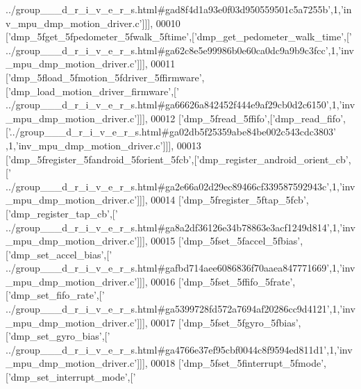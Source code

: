 \begin{DoxyCode}
{      ../group\_\_\_d\_r\_i\_v\_e\_r\_s.html#gad8f4d1a93e0f03d950559501c5a7255b'},1,\textcolor{stringliteral}{'inv\_mpu\_dmp\_motion\_driver.c'}]]],
00010   [\textcolor{stringliteral}{'dmp\_5fget\_5fpedometer\_5fwalk\_5ftime'},[\textcolor{stringliteral}{'dmp\_get\_pedometer\_walk\_time'},[\textcolor{stringliteral}{'
      ../group\_\_\_d\_r\_i\_v\_e\_r\_s.html#ga62c8e5e99986b0e60ca0dc9a9b9c3fcc'},1,\textcolor{stringliteral}{'inv\_mpu\_dmp\_motion\_driver.c'}]]],
00011   [\textcolor{stringliteral}{'dmp\_5fload\_5fmotion\_5fdriver\_5ffirmware'},[\textcolor{stringliteral}{'dmp\_load\_motion\_driver\_firmware'},[\textcolor{stringliteral}{'
      ../group\_\_\_d\_r\_i\_v\_e\_r\_s.html#ga66626a842452f444e9af29cb0d2c6150'},1,\textcolor{stringliteral}{'inv\_mpu\_dmp\_motion\_driver.c'}]]],
00012   [\textcolor{stringliteral}{'dmp\_5fread\_5ffifo'},[\textcolor{stringliteral}{'dmp\_read\_fifo'},[\textcolor{stringliteral}{'../group\_\_\_d\_r\_i\_v\_e\_r\_s.html#ga02db5f25359abe84be002c543cdc3803'}
      ,1,\textcolor{stringliteral}{'inv\_mpu\_dmp\_motion\_driver.c'}]]],
00013   [\textcolor{stringliteral}{'dmp\_5fregister\_5fandroid\_5forient\_5fcb'},[\textcolor{stringliteral}{'dmp\_register\_android\_orient\_cb'},[\textcolor{stringliteral}{'
      ../group\_\_\_d\_r\_i\_v\_e\_r\_s.html#ga2e66a02d29ec89466cf339587592943c'},1,\textcolor{stringliteral}{'inv\_mpu\_dmp\_motion\_driver.c'}]]],
00014   [\textcolor{stringliteral}{'dmp\_5fregister\_5ftap\_5fcb'},[\textcolor{stringliteral}{'dmp\_register\_tap\_cb'},[\textcolor{stringliteral}{'
      ../group\_\_\_d\_r\_i\_v\_e\_r\_s.html#ga8a2df36126e34b78863e3acf1249d814'},1,\textcolor{stringliteral}{'inv\_mpu\_dmp\_motion\_driver.c'}]]],
00015   [\textcolor{stringliteral}{'dmp\_5fset\_5faccel\_5fbias'},[\textcolor{stringliteral}{'dmp\_set\_accel\_bias'},[\textcolor{stringliteral}{'
      ../group\_\_\_d\_r\_i\_v\_e\_r\_s.html#gafbd714aee6086836f70aaea847771669'},1,\textcolor{stringliteral}{'inv\_mpu\_dmp\_motion\_driver.c'}]]],
00016   [\textcolor{stringliteral}{'dmp\_5fset\_5ffifo\_5frate'},[\textcolor{stringliteral}{'dmp\_set\_fifo\_rate'},[\textcolor{stringliteral}{'
      ../group\_\_\_d\_r\_i\_v\_e\_r\_s.html#ga5399728fd572a7694af20286cc9d4121'},1,\textcolor{stringliteral}{'inv\_mpu\_dmp\_motion\_driver.c'}]]],
00017   [\textcolor{stringliteral}{'dmp\_5fset\_5fgyro\_5fbias'},[\textcolor{stringliteral}{'dmp\_set\_gyro\_bias'},[\textcolor{stringliteral}{'
      ../group\_\_\_d\_r\_i\_v\_e\_r\_s.html#ga4766e37ef95cbf0044c8f9594ed811d1'},1,\textcolor{stringliteral}{'inv\_mpu\_dmp\_motion\_driver.c'}]]],
00018   [\textcolor{stringliteral}{'dmp\_5fset\_5finterrupt\_5fmode'},[\textcolor{stringliteral}{'dmp\_set\_interrupt\_mode'},[\textcolor{stringliteral}{'
}
\end{DoxyCode}
